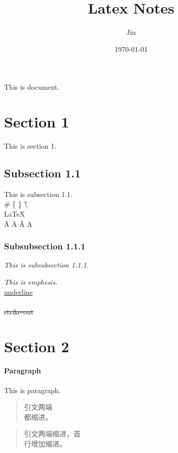 \documentclass{article}
\title{Latex Notes}
\author{Jin}
\date{\today}
\begin{document}
\maketitle
\tableofcontents %

This is document.
\section{Section 1}
\Large{This} \small{is} section 1.

\subsection{Subsection 1.1}
This is subsection 1.1. \\
\# \{ \} \~ \textbackslash \\
\LaTeX \\
\v{A} \={A} \~{A} \textcircled{A}

\subsubsection{Subsubsection 1.1.1}
\textit{This is subsubsection 1.1.1.}  
\begin{spacing}{1.3}
    \emph{This is emphesis.} \\
    \uline{underline} \\
     \\
    \sout{strike-out}
\end{spacing}




\newpage
\section{Section 2}

\paragraph{Paragraph}

\begin{flushleft}
    This is paragraph.
\end{flushleft}
\begin{quote}
引文两端\\都缩进。
\end{quote}

\begin{quotation}
引文两端缩进，首\\行增加缩进。
\end{quotation}
\end{document}
